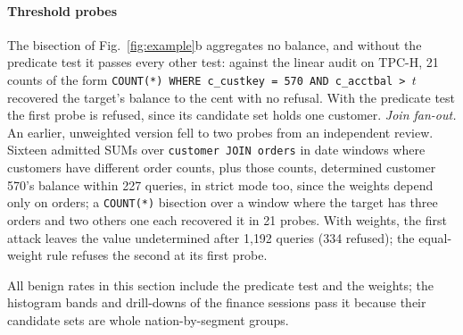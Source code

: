 \documentclass[10pt,journal,compsoc]{IEEEtran}
\begin{document}
\paragraph*{Threshold probes} The bisection of Fig.~\ref{fig:example}b aggregates no balance, and without the predicate test it passes every other test: against the linear audit on TPC-H, 21 counts of the form \texttt{COUNT(*) WHERE c\_custkey = 570 AND c\_acctbal > $t$} recovered the target's balance to the cent with no refusal. With the predicate test the first probe is refused, since its candidate set holds one customer. \emph{Join fan-out.} An earlier, unweighted version fell to two probes from an independent review. Sixteen admitted SUMs over \texttt{customer JOIN orders} in date windows where customers have different order counts, plus those counts, determined customer 570's balance within 227 queries, in strict mode too, since the weights depend only on orders; a \texttt{COUNT(*)} bisection over a window where the target has three orders and two others one each recovered it in 21 probes. With weights, the first attack leaves the value undetermined after 1{,}192 queries (334 refused); the equal-weight rule refuses the second at its first probe.

All benign rates in this section include the predicate test and the weights; the histogram bands and drill-downs of the finance sessions pass it because their candidate sets are whole nation-by-segment groups.
\end{document}
